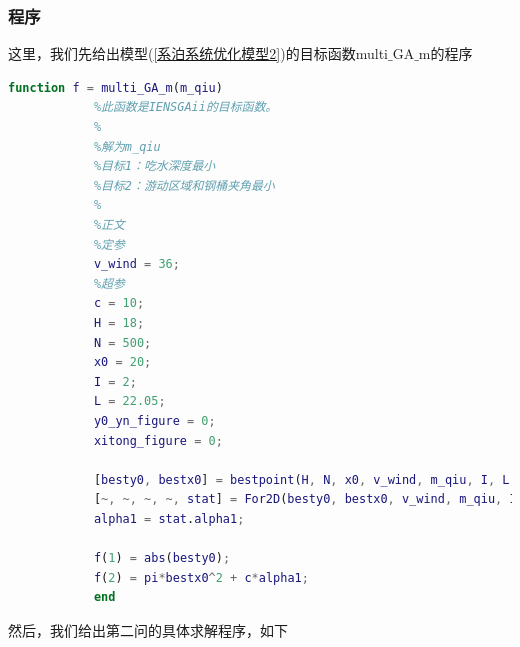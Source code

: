         \subsubsection{程序}
            \par
            这里，我们先给出模型(\ref{系泊系统优化模型2})的目标函数multi$\_$GA$\_$m的程序
            \begin{lstlisting}[language = Matlab]
            function f = multi_GA_m(m_qiu)
            %此函数是IENSGAii的目标函数。
            %
            %解为m_qiu
            %目标1：吃水深度最小
            %目标2：游动区域和钢桶夹角最小
            %
            %正文
            %定参
            v_wind = 36;
            %超参
            c = 10;
            H = 18;
            N = 500;
            x0 = 20;
            I = 2;
            L = 22.05;
            y0_yn_figure = 0;
            xitong_figure = 0;

            [besty0, bestx0] = bestpoint(H, N, x0, v_wind, m_qiu, I, L, y0_yn_figure);
            [~, ~, ~, ~, stat] = For2D(besty0, bestx0, v_wind, m_qiu, I, L, xitong_figure);
            alpha1 = stat.alpha1;

            f(1) = abs(besty0);
            f(2) = pi*bestx0^2 + c*alpha1;
            end
            \end{lstlisting}
            然后，我们给出第二问的具体求解程序，如下
